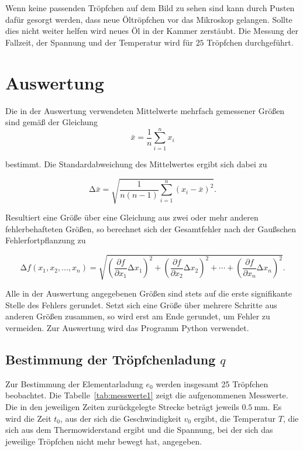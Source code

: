 \documentclass[
  bibliography=totoc,     %
  captions=tableheading,  %
  titlepage=firstiscover, %
]{scrartcl}
\begin{document}
\noindent
Wenn keine passenden Tröpfchen auf dem Bild zu sehen sind kann durch
Pusten dafür gesorgt werden, dass neue Öltröpfchen vor das Mikroskop
gelangen. Sollte dies nicht weiter helfen wird neues Öl in der Kammer
zerstäubt. Die Messung der Fallzeit, der Spannung und der Temperatur
wird für $25$ Tröpfchen durchgeführt.
\clearpage

\section{Auswertung}
\label{sec:auswertung}
Die in der Auswertung verwendeten Mittelwerte mehrfach gemessener Größen sind gemäß der
Gleichung
%
\begin{equation}
    \bar{x}=\frac{1}{n}\sum_{i=1}^n x_i
    \label{eq:mittelwert}
\end{equation}

bestimmt. Die Standardabweichung des Mittelwertes ergibt sich dabei zu

\begin{equation}
    \mathup{\Delta}\bar{x}=\sqrt{\frac{1}{n(n-1)}\sum_{i=1}^n\left(x_i-\bar{x}\right)^2}.
    \label{eq:standardabweichung}
\end{equation}

Resultiert eine Größe über eine Gleichung aus zwei oder mehr anderen fehlerbehafteten Größen, so
berechnet sich der Gesamtfehler nach der Gaußschen Fehlerfortpflanzung zu

\begin{equation}
    \mathup{\Delta}f(x_1,x_2,...,x_n)=\sqrt{\left(\frac{\partial f}{\partial x_1}\mathup{\Delta}x_1\right)^2+\left(\frac{\partial f}{\partial x_2}\mathup{\Delta}x_2\right)^2+ \dotsb +\left(\frac{\partial f}{\partial x_n}\mathup{\Delta}x_n\right)^2}.
    \label{eq:fehlerfortpflanzung}
\end{equation}

Alle in der Auswertung angegebenen Größen sind stets auf die erste signifikante Stelle des
Fehlers gerundet. Setzt sich eine Größe über mehrere Schritte aus anderen Größen zusammen,
so wird erst am Ende gerundet, um Fehler zu vermeiden. Zur Auswertung wird das Programm Python verwendet.
\subsection{Bestimmung der Tröpfchenladung \texorpdfstring{$q$}{q}}

Zur Bestimmung der Elementarladung $e_0$ werden insgesamt 25 Tröpfchen beobachtet. Die Tabelle~\ref{tab:messwerte1} zeigt die aufgenommenen Messwerte. Die in den jeweiligen Zeiten zurückgelegte Strecke beträgt jeweils $\SI{0.5}{\milli\metre}$. Es wird die Zeit $t_0$, aus der sich die Geschwindigkeit $v_0$ ergibt, die Temperatur $T$, die sich aus dem Thermowiderstand ergibt und die Spannung, bei der sich das jeweilige Tröpfchen nicht mehr bewegt hat, angegeben.
\end{document}
